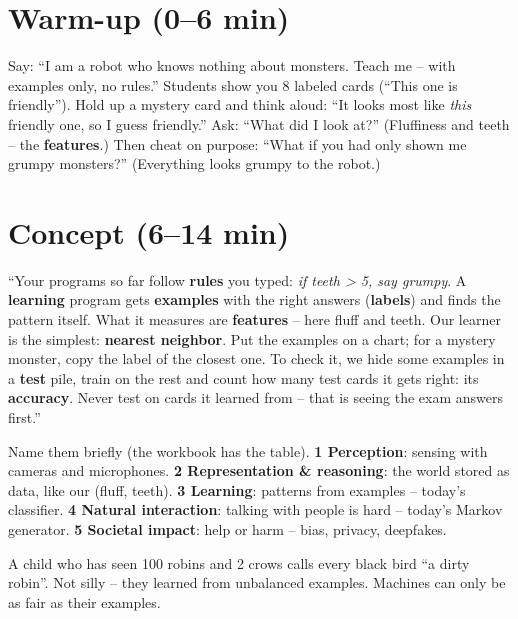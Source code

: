 \section{Warm-up (0--6 min)}
\begin{unplugged}
Say: \enquote{I am a robot who knows nothing about monsters. Teach me -- with examples only, no rules.} Students show you 8 labeled cards (\enquote{This one is friendly}). Hold up a mystery card and think aloud: \enquote{It looks most like \emph{this} friendly one, so I guess friendly.} Ask: \enquote{What did I look at?} (Fluffiness and teeth -- the \textbf{features}.) Then cheat on purpose: \enquote{What if you had only shown me grumpy monsters?} (Everything looks grumpy to the robot.)
\end{unplugged}

\section{Concept (6--14 min)}
\begin{teacherscript}
\enquote{Your programs so far follow \textbf{rules} you typed: \emph{if teeth > 5, say grumpy}. A \textbf{learning} program gets \textbf{examples} with the right answers (\textbf{labels}) and finds the pattern itself. What it measures are \textbf{features} -- here fluff and teeth. Our learner is the simplest: \textbf{nearest neighbor}. Put the examples on a chart; for a mystery monster, copy the label of the closest one. To check it, we hide some examples in a \textbf{test} pile, train on the rest and count how many test cards it gets right: its \textbf{accuracy}. Never test on cards it learned from -- that is seeing the exam answers first.}
\end{teacherscript}


\begin{teachernote}
Name them briefly (the workbook has the table). \textbf{1 Perception}: sensing with cameras and microphones. \textbf{2 Representation \& reasoning}: the world stored as data, like our (fluff, teeth). \textbf{3 Learning}: patterns from examples -- today's classifier. \textbf{4 Natural interaction}: talking with people is hard -- today's Markov generator. \textbf{5 Societal impact}: help or harm -- bias, privacy, deepfakes.
\end{teachernote}

\begin{analogy}
A child who has seen 100 robins and 2 crows calls every black bird \enquote{a dirty robin}. Not silly -- they learned from unbalanced examples. Machines can only be as fair as their examples.
\end{analogy}

